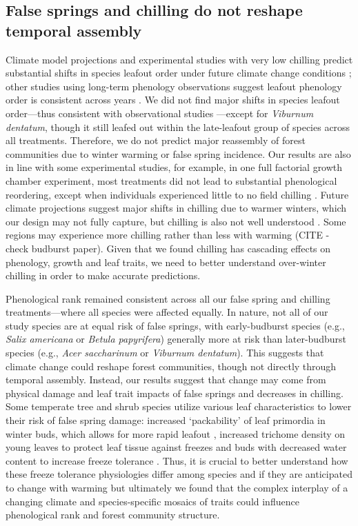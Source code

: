 \documentclass{article}\usepackage[]{graphicx}\usepackage[]{color}
\begin{document}
\subsection*{False springs and chilling do not reshape temporal assembly}
Climate model projections and experimental studies with very low chilling predict substantial shifts in species leafout order under future climate change conditions \citep{Roberts2015, Laube2014}; other studies using long-term phenology observations suggest leafout phenology order is consistent across years \citep{Wesolowski2006}. We did not find major shifts in species leafout order---thus consistent with observational studies \citep{Wesolowski2006}---except for \textit{Viburnum dentatum}, though it still leafed out within the late-leafout group of species across all treatments. Therefore, we do not predict major reassembly of forest communities due to winter warming or false spring incidence. Our results are also in line with some experimental studies, for example, in one full factorial growth chamber experiment, most treatments did not lead to substantial phenological reordering, except when individuals experienced little to no field chilling \citep{Laube2014}. Future climate projections suggest major shifts in chilling due to warmer winters, which our design may not fully capture, but chilling is also not well understood \citep{Nanninga2017}. Some regions may experience more chilling rather than less with warming (CITE - check budburst paper). Given that we found chilling has cascading effects on phenology, growth and leaf traits, we need to better understand over-winter chilling in order to make accurate predictions. 
    
Phenological rank remained consistent across all our false spring and chilling treatments---where all species were affected equally. In nature, not all of our study species are at equal risk of false springs, with early-budburst species (e.g., \textit{Salix americana} or \textit{Betula papyrifera}) generally more at risk than later-budburst species (e.g., \textit{Acer saccharinum} or \textit{Viburnum dentatum}). This suggests that climate change could reshape forest communities, though not directly through temporal assembly. Instead, our results suggest that change may come from physical damage and leaf trait impacts of false springs and decreases in chilling. Some temperate tree and shrub species utilize various leaf characteristics to lower their risk of false spring damage: increased `packability' of leaf primordia in winter buds, which allows for more rapid leafout \citep{Edwards2017}, increased trichome density on young leaves to protect leaf tissue against freezes \citep{Agrawal2004, Prozherina2003} and buds with decreased water content to increase freeze tolerance \citep{Beck2007, Hofmann2015, Kathke2011, Morin2007,  Muffler2016, Nielsen2009, Poirier2010}. Thus, it is crucial to better understand how these freeze tolerance physiologies differ among species and if they are anticipated to change with warming but ultimately we found that the complex interplay of a changing climate and species-specific mosaics of traits could influence phenological rank and forest community structure. 
\end{document}
